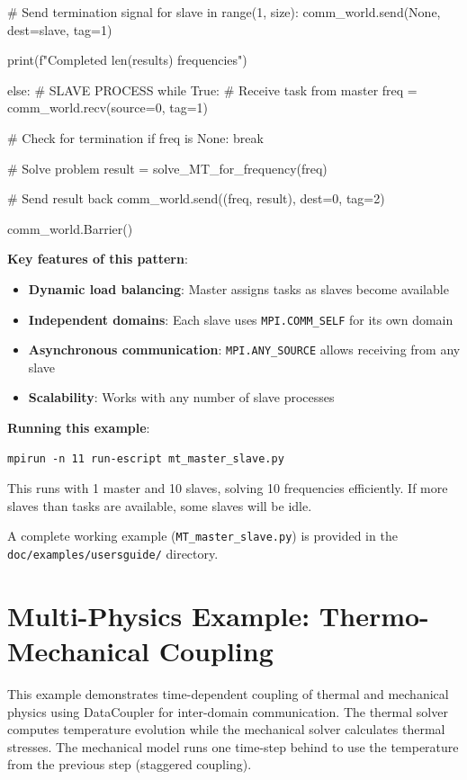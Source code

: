 \begin{python}
    # Send termination signal
    for slave in range(1, size):
        comm_world.send(None, dest=slave, tag=1)

    print(f"Completed {len(results)} frequencies")

else:
    # SLAVE PROCESS
    while True:
        # Receive task from master
        freq = comm_world.recv(source=0, tag=1)

        # Check for termination
        if freq is None:
            break

        # Solve problem
        result = solve_MT_for_frequency(freq)

        # Send result back
        comm_world.send((freq, result), dest=0, tag=2)

comm_world.Barrier()
\end{python}

\textbf{Key features of this pattern}:
\begin{itemize}
\item \textbf{Dynamic load balancing}: Master assigns tasks as slaves become available
\item \textbf{Independent domains}: Each slave uses \texttt{MPI.COMM\_SELF} for its own domain
\item \textbf{Asynchronous communication}: \texttt{MPI.ANY\_SOURCE} allows receiving from any slave
\item \textbf{Scalability}: Works with any number of slave processes
\end{itemize}

\textbf{Running this example}:
\begin{verbatim}
mpirun -n 11 run-escript mt_master_slave.py
\end{verbatim}

This runs with 1 master and 10 slaves, solving 10 frequencies efficiently. If more slaves than tasks are available, some slaves will be idle.

A complete working example (\texttt{MT\_master\_slave.py}) is provided in the \texttt{doc/examples/usersguide/} directory.

\section{Multi-Physics Example: Thermo-Mechanical Coupling}

This example demonstrates time-dependent coupling of thermal and mechanical physics using DataCoupler for inter-domain communication. The thermal solver computes temperature evolution while the mechanical solver calculates thermal stresses. The mechanical model runs one time-step behind to use the temperature from the previous step (staggered coupling).

